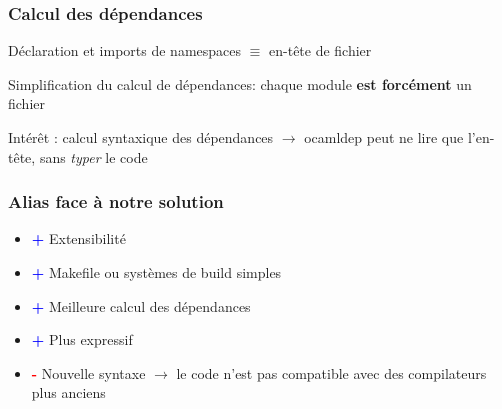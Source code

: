 \documentclass{beamer}
\begin{document}
\begin{frame}
\frametitle{Calcul des dépendances}

Déclaration et imports de namespaces $\equiv$ en-tête de fichier

\bigskip

Simplification du calcul de dépendances: chaque module \textbf{est forcément} un fichier

\bigskip

Intérêt : calcul syntaxique des dépendances
$\rightarrow$ ocamldep peut ne lire que l'en-tête, sans \emph{typer} le code

\end{frame}







\begin{frame}
\frametitle{Alias face à notre solution}
\begin{itemize}[<+->]
\item \textcolor{blue}{\textbf{+}} Extensibilité
\item \textcolor{blue}{\textbf{+}} Makefile ou systèmes de build simples
\item \textcolor{blue}{\textbf{+}} Meilleure calcul des dépendances
\item \textcolor{blue}{\textbf{+}} Plus expressif
\item \textcolor{red}{\textbf{-}} Nouvelle syntaxe $\rightarrow$ le code n'est
  pas compatible avec des compilateurs plus anciens
\end{itemize}
\end{frame}
\end{document}
